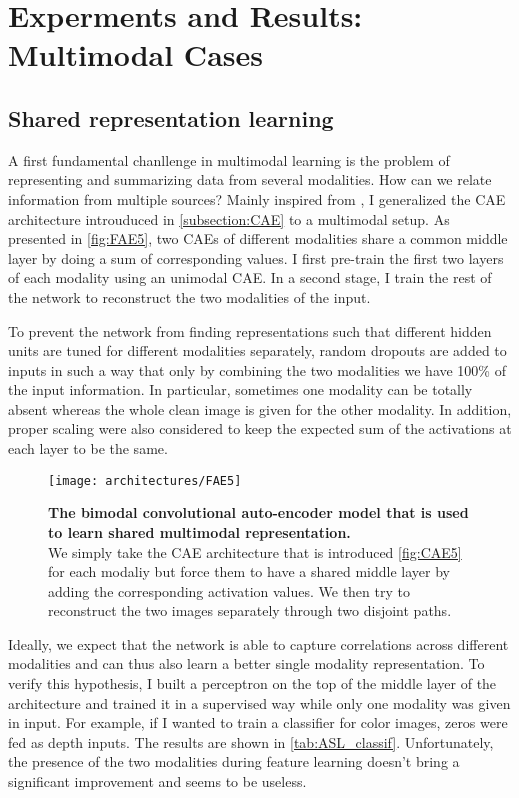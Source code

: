 \section{Experments and Results: Multimodal Cases} \label{section:multi}

\subsection{Shared representation learning} \label{subsection:shared}

A first fundamental chanllenge in multimodal learning is the problem
of representing and summarizing data from several modalities.
How can we relate information from multiple sources?
Mainly inspired from \cite{J. Ngiam 2011, A. Droniou 2014},
I generalized the CAE architecture introuduced in \ref{subsection:CAE}
to a multimodal setup. As presented in \autoref{fig:FAE5}, two CAEs
of different modalities share a common middle layer by doing a sum
of corresponding values. I first pre-train the first two layers
of each modality using an unimodal CAE. In a second stage, I train the
rest of the network to reconstruct the two modalities of the input.

To prevent the network from finding representations such that different
hidden units are tuned for different modalities separately, random
dropouts are added to inputs in such a way that only by combining the
two modalities we have 100\% of the input information. In particular,
sometimes one modality can be totally absent whereas the whole clean
image is given for the other modality. In addition, proper scaling were
also considered to keep the expected sum of the activations at each layer
to be the same.

\begin{figure}[H]
  \centering
  \texttt{[image: architectures/FAE5]}
  \caption{%
    \textbf{The bimodal convolutional auto-encoder model that is
      used to learn shared multimodal representation.}\\[0.1em]
    We simply take the CAE architecture that is introduced
      \autoref{fig:CAE5} for each modaliy but force them to have a
      shared middle layer by adding the corresponding activation values.
      We then try to reconstruct the two images separately through
      two disjoint paths.}
  \label{fig:FAE5}
\end{figure}

Ideally, we expect that the network is able to capture correlations
across different modalities and can thus also learn a better single
modality representation. To verify this hypothesis, I built a perceptron
on the top of the middle layer of the architecture and trained it
in a supervised way while only one modality was given in input. For example,
if I wanted to train a classifier for color images, zeros were fed as
depth inputs. The results are shown in \autoref{tab:ASL_classif}.
Unfortunately, the presence of the two modalities during feature
learning doesn't bring a significant improvement and seems to be useless.

